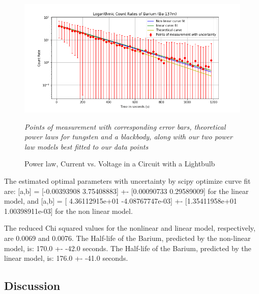 \documentclass[letterpaper,12pt]{article}
\begin{document}
\begin{figure}[H]
  \centering
  \includegraphics[width=0.95\linewidth]{../Exercise2/Fredrik/Logarithmic Count Rates of Barium (Ba-137m).png}   
  \begin{center}
    \emph{
    Points of measurement with corresponding error bars, theoretical power laws for 
  tungsten and a blackbody, along with our two power law models best fitted to our data 
  points}
  \end{center}
  \caption{Power law, Current vs. Voltage in a Circuit with a Lightbulb}
  \label{power-law}
\end{figure}

The estimated optimal parameters with uncertainty by scipy optimize curve fit are: 
[a,b] = [-0.00393908  3.75408883] +- [0.00090733 0.29589009] for the linear model, and
[a,b] = [ 4.36112915e+01 -4.08767747e-03] +- [1.35411958e+01 1.00398911e-03] for the non linear model.

The reduced Chi squared values for the nonlinear and linear model, respectively, are 0.0069 and 0.0076.
The Half-life of the Barium, predicted by the non-linear model, is: 170.0 +- -42.0 seconds.
The Half-life of the Barium, predicted by the linear model, is: 176.0 +- -41.0 seconds.

\subsection{Discussion}
\end{document}
